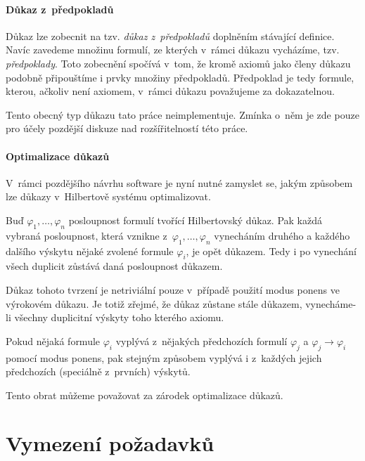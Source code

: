 \documentclass[thesis=B,czech,hidelinks]{FITthesis}[2012/06/26]
\begin{document}
\subsubsection{Důkaz z~předpokladů}
\label{sec:dzp}

Důkaz lze zobecnit na tzv. \emph{důkaz z~předpokladů} doplněním stávající definice. Navíc zavedeme množinu formulí, ze kterých v~rámci důkazu vycházíme, tzv. \emph{předpoklady}. Toto zobecnění spočívá v~tom, že kromě axiomů jako členy důkazu podobně připouštíme i prvky množiny předpokladů\cite{sochor}. Předpoklad je tedy formule, kterou, ačkoliv není axiomem, v~rámci důkazu považujeme za dokazatelnou.

Tento obecný typ důkazu tato práce neimplementuje. Zmínka o~něm je zde pouze pro účely pozdější diskuze nad rozšířitelností této práce.

\subsubsection{Optimalizace důkazů}

V~rámci pozdějšího návrhu software je nyní nutné zamyslet se, jakým způsobem lze důkazy v~Hilbertově systému optimalizovat.

\begin{lm}
Buď $\varphi_1, \ldots, \varphi_n$ posloupnost formulí tvořící Hilbertovský důkaz. Pak každá vybraná posloupnost, která vznikne z~$\varphi_1, \ldots, \varphi_n$ vynecháním druhého a každého dalšího výskytu nějaké zvolené formule $\varphi_i$, je opět důkazem. Tedy i po vynechání všech duplicit zůstává daná posloupnost důkazem.
\end{lm}

Důkaz tohoto tvrzení je netriviální pouze v~případě použití modus ponens ve výrokovém důkazu. Je totiž zřejmé, že důkaz zůstane stále důkazem, vynecháme-li všechny duplicitní výskyty toho kterého axiomu.

\begin{pf}
Pokud nějaká formule $\varphi_i$ vyplývá z~nějakých předchozích formulí $\varphi_j$ a $\varphi_j \to \varphi_i$ pomocí modus ponens, pak stejným způsobem vyplývá i z~každých jejich předchozích (speciálně z~prvních) výskytů.
\end{pf}

Tento obrat můžeme považovat za zárodek optimalizace důkazů.

%
%
%

\chapter{Vymezení požadavků}
\end{document}
